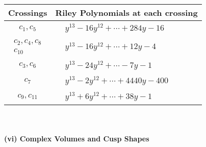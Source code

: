 \documentclass[1p]{elsarticle_modified}
\theoremstyle{definition}
\begin{document}
\begin{tabular}{m{50pt}|m{274pt}}
Crossings & \hspace{64pt}Riley Polynomials at each crossing \\
\hline $$\begin{aligned}c_{1},c_{5}\end{aligned}$$&$\begin{aligned}
&y^{13}-16 y^{12}+\cdots+284 y-16
\end{aligned}$\\
\hline $$\begin{aligned}c_{2},c_{4},c_{8}\\c_{10}\end{aligned}$$&$\begin{aligned}
&y^{13}-16 y^{12}+\cdots+12 y-4
\end{aligned}$\\
\hline $$\begin{aligned}c_{3},c_{6}\end{aligned}$$&$\begin{aligned}
&y^{13}-24 y^{12}+\cdots-7 y-1
\end{aligned}$\\
\hline $$\begin{aligned}c_{7}\end{aligned}$$&$\begin{aligned}
&y^{13}-2 y^{12}+\cdots+4440 y-400
\end{aligned}$\\
\hline $$\begin{aligned}c_{9},c_{11}\end{aligned}$$&$\begin{aligned}
&y^{13}+6 y^{12}+\cdots+38 y-1
\end{aligned}$\\
\hline
\end{tabular}\\~\\
\newpage\flushleft \textbf{(vi) Complex Volumes and Cusp Shapes}
\end{document}
